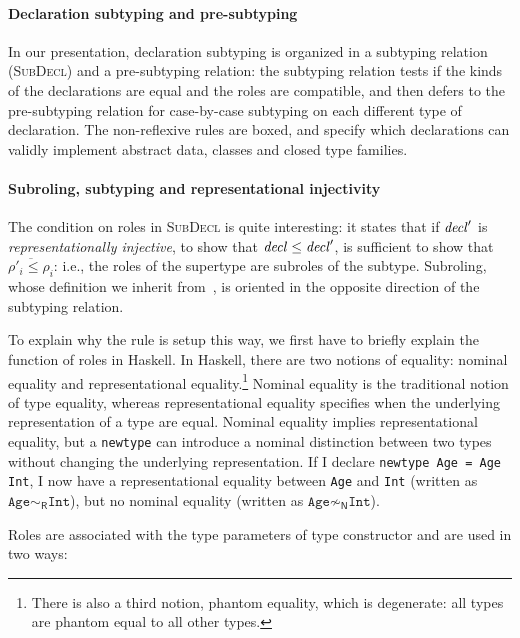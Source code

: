 \paragraph{Declaration subtyping and pre-subtyping}
In our presentation, declaration subtyping is organized in a subtyping
relation (\textsc{SubDecl}) and a pre-subtyping relation: the subtyping
relation tests if the kinds of the declarations are equal and the roles
are compatible, and then defers to the pre-subtyping relation for
case-by-case subtyping on each different type of declaration.  The
non-reflexive rules are boxed, and specify which declarations can
validly implement abstract data, classes and closed type families.

\paragraph{Subroling, subtyping and representational injectivity}
The condition on roles in \textsc{SubDecl} is quite interesting:
it states that if $\mathit{decl}'$ is \emph{representationally injective},
to show that $\mathit{decl} \le \mathit{decl}'$,
is sufficient to show that $\overline{\rho'_i \le \rho_i}$: i.e.,
the roles of the supertype are subroles of the subtype.
Subroling, whose definition we inherit from~\cite{Breitner:2014:SZC:2692915.2628141},
is oriented in the opposite direction of the subtyping relation.

To explain why the rule is setup this way, we first have to briefly
explain
the function of roles in Haskell.  In Haskell, there are two notions of
equality: nominal equality and representational equality.\footnote{There is also
a third notion, phantom equality, which is degenerate: all types are phantom
equal to all other types.}  Nominal
equality is the traditional notion of type equality, whereas
representational equality specifies when the underlying representation
of a type are equal.  Nominal equality implies representational
equality, but a \verb|newtype| can introduce a nominal distinction between
two types without changing the underlying representation. If I declare
\verb|newtype Age = Age Int|, I now have a representational equality
between \verb|Age| and \verb|Int| (written as $\texttt{Age}
\sim_\textsf{R} \texttt{Int}$), but no nominal equality (written as $\texttt{Age}
\not\sim_\textsf{N} \texttt{Int}$).

Roles are associated with the type parameters of type constructor and
are used in two ways:

